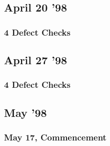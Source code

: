 \subsection{April 20 '98}
\subsubsection{4 Defect Checks}

\subsection{April 27 '98}
\subsubsection{4 Defect Checks}

\subsection{May '98}
\subsubsection{May 17, Commencement}










